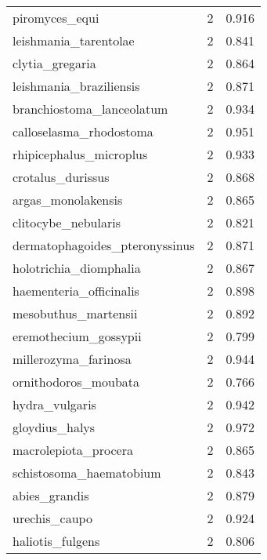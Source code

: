 \begin{tabular}{lrr}
                 piromyces\_equi &                   2 &     0.916 \\
          leishmania\_tarentolae &                   2 &     0.841 \\
                clytia\_gregaria &                   2 &     0.864 \\
        leishmania\_braziliensis &                   2 &     0.871 \\
      branchiostoma\_lanceolatum &                   2 &     0.934 \\
        calloselasma\_rhodostoma &                   2 &     0.951 \\
        rhipicephalus\_microplus &                   2 &     0.933 \\
              crotalus\_durissus &                   2 &     0.868 \\
             argas\_monolakensis &                   2 &     0.865 \\
            clitocybe\_nebularis &                   2 &     0.821 \\
 dermatophagoides\_pteronyssinus &                   2 &     0.871 \\
         holotrichia\_diomphalia &                   2 &     0.867 \\
        haementeria\_officinalis &                   2 &     0.898 \\
           mesobuthus\_martensii &                   2 &     0.892 \\
          eremothecium\_gossypii &                   2 &     0.799 \\
           millerozyma\_farinosa &                   2 &     0.944 \\
           ornithodoros\_moubata &                   2 &     0.766 \\
                 hydra\_vulgaris &                   2 &     0.942 \\
                 gloydius\_halys &                   2 &     0.972 \\
           macrolepiota\_procera &                   2 &     0.865 \\
        schistosoma\_haematobium &                   2 &     0.843 \\
                  abies\_grandis &                   2 &     0.879 \\
                  urechis\_caupo &                   2 &     0.924 \\
               haliotis\_fulgens &                   2 &     0.806 \\

\end{tabular}
